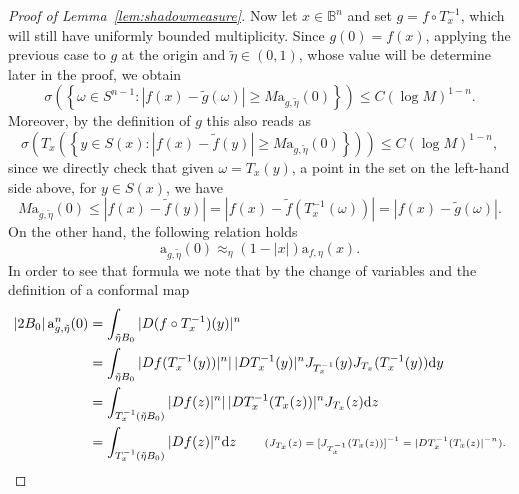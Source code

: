 \documentclass[11pt,a4paper,reqno]{amsart}
\theoremstyle{definition}
\newcommand{\om}{\omega}
\newcommand{\B}{\mathbb{B}^n}
\newcommand{\ud}{\mathrm {d}}
\numberwithin{komcounter}{section}
\begin{document}
\begin{appendix}
\begin{proof}[Proof of Lemma~\ref{lem:shadowmeasure}]
Now let $x\in\B$ and set $g=f\circ T_x^{-1}$, which will still have uniformly bounded multiplicity. Since $g(0)=f(x)$, applying the previous case to $g$ at the origin and $\tilde{\eta}\in (0,1)$, whose value will be determine later in the proof, we obtain 
$$
\sigma\left(\left\{ \om \in S^{n-1}:|f(x)-\tilde{g}(\om)|\geq M\mathrm a_{g,\tilde{\eta}} (0)\right\}\right)\leq C (\log M)^{1-n}.
$$
Moreover, by the definition of $g$ this also reads as
\begin{equation}\label{lem:assert-x}
\sigma\left(T_x\left(\left\{y\in S(x):|f(x)-\tilde{f}(y)|\geq M\mathrm a_{g,\tilde{\eta}} (0)\right\}\right)\right)\leq C (\log M)^{1-n},
\end{equation}
since we directly check that given $\om=T_x(y)$, a point in the set on the left-hand side above, for $y\in S(x)$, we have 
$$
M\mathrm a_{g,\tilde{\eta}} (0) \leq |f(x)-\tilde{f}(y)|=|f(x)-\tilde{f}(T_x^{-1}(\om))|=|f(x)-\tilde{g}(\om)|.
$$
On the other hand, the following relation holds
\[
\mathrm a_{g,\tilde{\eta}} (0) \approx_\eta (1-|x|)\mathrm a_{f,\eta}(x).
\] 
%
In order to see that formula we note that by the change of variables and the definition of a conformal map
\begin{align*}
|2B_0|\, \mathrm a_{g,\tilde{\eta}}^n (0) &= \int_{\tilde{\eta} B_0} |D(f\circ T_x^{-1})(y)|^n \\
&=\int_{\tilde{\eta} B_0} |Df(T_x^{-1}(y))|^n|\,|D T_x^{-1}(y)|^n J_{T_x^{-1}}(y)J_{T_x}(T_x^{-1}(y))\ud y \\
&=\int_{T_x^{-1}(\tilde{\eta} B_0)} |Df(z)|^n|\,|D T_x^{-1}(T_x(z))|^n J_{T_x}(z)\ud z \\
&=\int_{T_x^{-1}(\tilde{\eta} B_0)} |Df(z)|^n \ud z \qquad \text{\scriptsize{$(J_{T_x}(z)=[ J_{T_x^{-1}}(T_x(z)) ]^{-1}=|DT_x^{-1}(T_{x}(z)|^{-n})$.}}
\end{align*}

\end{proof}
\end{appendix}
\end{document}
